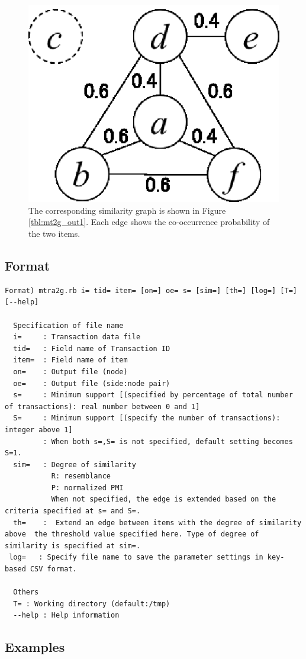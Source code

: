 \begin{figure}[htbp]
\begin{center}
\begin{minipage}{0.3\hsize}
\includegraphics[scale=0.6]{./simg.eps}
\caption{The corresponding similarity graph is shown in Figure \ref{tbl:mt2g_out1}. Each edge shows the co-occurrence probability of the two items. \label{fig:mt2g_out1}}
\end{minipage}
\end{center}
\end{figure}


\subsection{Format}
\begin{verbatim}
Format) mtra2g.rb i= tid= item= [on=] oe= s= [sim=] [th=] [log=] [T=] [--help]

  Specification of file name
  i=     : Transaction data file 
  tid=   : Field name of Transaction ID
  item=  : Field name of item 
  on=    : Output file (node)
  oe=    : Output file (side:node pair)
  s=     : Minimum support [(specified by percentage of total number of transactions): real number between 0 and 1]
  S=     : Minimum support [(specify the number of transactions): integer above 1]
         : When both s=,S= is not specified, default setting becomes S=1. 
  sim=   : Degree of similarity
           R: resemblance
           P: normalized PMI
           When not specified, the edge is extended based on the criteria specified at s= and S=. 
  th=    :  Extend an edge between items with the degree of similarity above  the threshold value specified here. Type of degree of similarity is specified at sim=.
 log=   : Specify file name to save the parameter settings in key-based CSV format. 

  Others
  T= : Working directory (default:/tmp)
  --help : Help information 
\end{verbatim}

\subsection{Examples}



